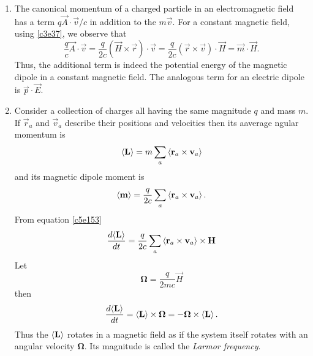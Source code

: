 \begin{enumerate}
\item The canonical momentum of a charged particle in an electromagnetic field 
has a term $q\vec{A}\cdot\vec{v}/c$ in addition to the $m\vec{v}$. For a constant 
magnetic field, using \eqref{c3e37}, we observe that
\begin{equation}\label{c5e154}
\frac{q}{c}\vec{A}\cdot\vec{v} = \frac{q}{2c}(\vec{H} \times \vec{r})\cdot\vec{v} = 
\frac{q}{2c}(\vec{r}\times\vec{v})\cdot\vec{H} = \vec{m}\cdot\vec{H}.
\end{equation}
Thus, the additional term is indeed the potential energy of the magnetic dipole
in a constant magnetic field. The analogous term for an electric dipole is 
$\vec{p}\cdot\vec{E}$.

\item Consider a collection of charges all having the same magnitude $q$ and mass
$m$. If $\vec{r}_a$ and $\vec{v}_a$ describe their positions and velocities then
its aaverage ngular momentum is
\[
\left\langle{\mathbf{L}}\right\rangle = m\sum_a\left\langle{\mathbf{r}_a \times \mathbf{v}_a}\right\rangle
\]
and its magnetic dipole moment is
\[
\left\langle{\mathbf{m}}\right\rangle = \frac{q}{2c}\sum_a\left\langle{\mathbf{r}_a \times \mathbf{v}_a}\right\rangle.
\]
From equation \eqref{c5e153}
\[
\frac{d{\left\langle{\mathbf{L}}\right\rangle}}{d{t}} = \frac{q}{2c}\sum_a\left\langle{\mathbf{r}_a \times \mathbf{v}_a}\right\rangle \times \mathbf{H}
\]
Let
\begin{equation}\label{c5e155}
\bm{\Omega} = \frac{q}{2mc}\vec{H}
\end{equation}
then 
\begin{equation}\label{c5e156}
\frac{d{\left\langle{\mathbf{L}}\right\rangle}}{d{t}} = \left\langle{\mathbf{L}}\right\rangle \times \bm{\Omega} = -\bm{\Omega} \times \left\langle{\mathbf{L}}\right\rangle.
\end{equation}
Thus the $\left\langle{\mathbf{L}}\right\rangle$ rotates in a magnetic field as if the system itself rotates
with an angular velocity $\bm{\Omega}$. Its magnitude is called the \emph{Larmor
frequency}.
\end{enumerate}

